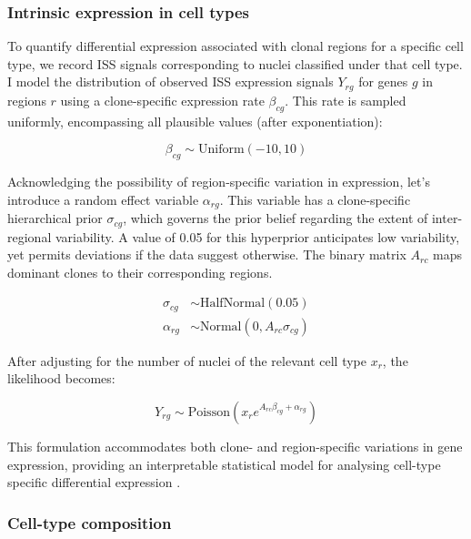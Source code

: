 \subsubsection*{Intrinsic expression in cell types}

To quantify differential expression associated with clonal regions for a specific cell type, we record \ac{ISS} signals corresponding to nuclei classified under that cell type. I model the distribution of observed \ac{ISS} expression signals $Y_{rg}$ for genes $g$ in regions $r$ using a clone-specific expression rate $\beta_{cg}$. This rate is sampled uniformly, encompassing all plausible values (after exponentiation):

\begin{equation}
    \beta_{cg} \sim \text{Uniform}(-10,10)
\end{equation}

Acknowledging the possibility of region-specific variation in expression, let's introduce a random effect variable $\alpha_{rg}$. This variable has a clone-specific hierarchical prior $\sigma_{cg}$, which governs the prior belief regarding the extent of inter-regional variability. A value of 0.05 for this hyperprior anticipates low variability, yet permits deviations if the data suggest otherwise. The binary matrix $A_{rc}$ maps dominant clones to their corresponding regions.

\begin{align}
    \sigma_{cg} &\sim \text{HalfNormal}(0.05) \\
    \alpha_{rg} &\sim \text{Normal}(0, A_{rc}\sigma_{cg})
\end{align}

After adjusting for the number of nuclei of the relevant cell type 
$x_r$, the likelihood becomes:

\begin{equation}
    Y_{rg} \sim \text{Poisson}\left(x_r e^{A_{rc}\beta_{cg} + \alpha_{rg}}\right)
\end{equation}
    
This formulation accommodates both clone- and region-specific variations in gene expression, providing an interpretable statistical model for analysing cell-type specific differential expression .

\subsubsection*{Cell-type composition}

